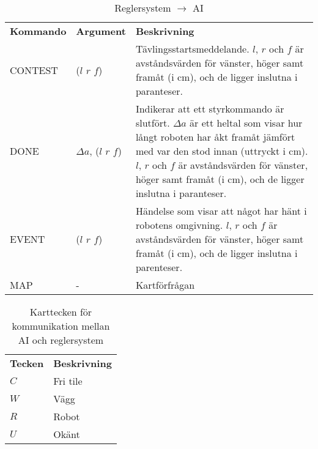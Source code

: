 \begin{table}[H]
	\caption{Reglersystem $\rightarrow$ AI}
	\label{reg_ai}
	\begin{tabularx}{\linewidth}{l l X}
	\textbf{Kommando} & \textbf{Argument} & \textbf{Beskrivning} \\
	CONTEST	& ($l$ $r$ $f$) & Tävlingsstartsmeddelande. $l$, $r$ och $f$ är
	avståndsvärden för vänster, höger samt framåt (i cm), och de ligger
	inslutna i paranteser.  \\

	DONE	& $\Delta a$, ($l$ $r$ $f$) & Indikerar att ett
	styrkommando är slutfört. $\Delta a$ är ett heltal som visar hur långt
	roboten har åkt framåt jämfört med var den stod innan (uttryckt i cm).
	$l$, $r$ och $f$ är avståndsvärden för vänster, höger samt framåt
	(i cm), och de ligger inslutna i paranteser. \\

	EVENT	& ($l$ $r$ $f$) & Händelse som visar att något har hänt
	i robotens omgivning. $l$, $r$ och $f$ är avståndsvärden för vänster,
	höger samt framåt (i cm), och de ligger inslutna i parenteser. \\

	MAP	&	-	& Kartförfrågan \\
	\end{tabularx}
\end{table}

\begin{table}[H]
	\caption{Karttecken för kommunikation mellan AI och reglersystem}
	\label{map_c}
	\begin{tabular}{l l}
	\textbf{Tecken}	& \textbf{Beskrivning} \\
	$C$	& Fri tile \\
	$W$	& Vägg \\
	$R$	& Robot \\
	$U$	& Okänt \\
	\end{tabular}
\end{table}
